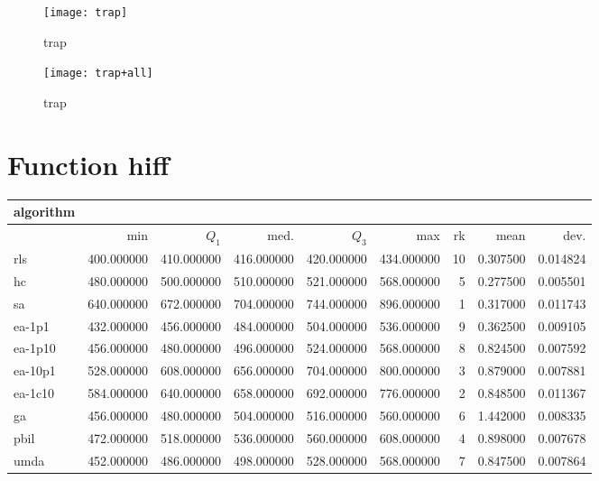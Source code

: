 \begin{center}
\begin{figure}[h]
\centering
\texttt{[image: trap]}
\caption{trap}
\end{figure}
\end{center}

\begin{center}
\begin{figure}[h]
\centering
\texttt{[image: trap+all]}
\caption{trap}
\end{figure}
\end{center}

\newpage

\section{Function hiff}
\begin{center}
\begin{tabular}{@{}l*{5}{>{{}}N{3}{0}}>{{}}N{2}{0}N{1}{3}N{1}{3}@{}}
\toprule
{algorithm} &  &  \\
\midrule
& {min} & {$Q_1$} & {med.} & {$Q_3$} & {max} & {rk} & {mean} & {dev.} \\
\midrule
rls & 400.000000 & 410.000000 & 416.000000 & 420.000000 & 434.000000 & 10 & 0.307500 & 0.014824 \\
 hc & 480.000000 & 500.000000 & 510.000000 & 521.000000 & 568.000000 & 5 & 0.277500 & 0.005501 \\
 sa & {\color{blue}} 640.000000 & {\color{blue}} 672.000000 & {\color{blue}} 704.000000 & {\color{blue}} 744.000000 & {\color{blue}} 896.000000 & 1 & 0.317000 & 0.011743 \\
 ea-1p1 & 432.000000 & 456.000000 & 484.000000 & 504.000000 & 536.000000 & 9 & 0.362500 & 0.009105 \\
 ea-1p10 & 456.000000 & 480.000000 & 496.000000 & 524.000000 & 568.000000 & 8 & 0.824500 & 0.007592 \\
 ea-10p1 & 528.000000 & 608.000000 & 656.000000 & 704.000000 & 800.000000 & 3 & 0.879000 & 0.007881 \\
 ea-1c10 & 584.000000 & 640.000000 & 658.000000 & 692.000000 & 776.000000 & 2 & 0.848500 & 0.011367 \\
 ga & 456.000000 & 480.000000 & 504.000000 & 516.000000 & 560.000000 & 6 & 1.442000 & 0.008335 \\
 pbil & 472.000000 & 518.000000 & 536.000000 & 560.000000 & 608.000000 & 4 & 0.898000 & 0.007678 \\
 umda & 452.000000 & 486.000000 & 498.000000 & 528.000000 & 568.000000 & 7 & 0.847500 & 0.007864 \\
 \bottomrule
\end{tabular}
\end{center}

